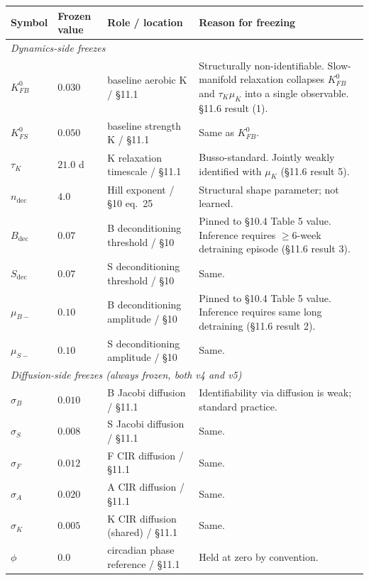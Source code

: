 \begin{center}\small
\begin{tabular}{lllp{6cm}}
\toprule
Symbol & Frozen value & Role / location & Reason for freezing \\
\midrule
\multicolumn{4}{l}{\textit{Dynamics-side freezes}} \\
\midrule
$K_{FB}^0$  & $0.030$ & baseline aerobic K / §11.1   & Structurally non-identifiable. Slow-manifold relaxation collapses $K_{FB}^0$ and $\tau_K \mu_K$ into a single observable. §11.6 result (1). \\
$K_{FS}^0$  & $0.050$ & baseline strength K / §11.1  & Same as $K_{FB}^0$. \\
$\tau_K$    & $21.0$ d & K relaxation timescale / §11.1 & Busso-standard. Jointly weakly identified with $\mu_K$ (§11.6 result 5). \\
$n_\text{dec}$ & $4.0$ & Hill exponent / §10 eq.\ 25 & Structural shape parameter; not learned. \\
$B_\text{dec}$ & $0.07$ & B deconditioning threshold / §10 & Pinned to §10.4 Table 5 value. Inference requires $\ge 6$-week detraining episode (§11.6 result 3). \\
$S_\text{dec}$ & $0.07$ & S deconditioning threshold / §10 & Same. \\
$\mu_{B-}$ & $0.10$ & B deconditioning amplitude / §10 & Pinned to §10.4 Table 5 value. Inference requires same long detraining (§11.6 result 2). \\
$\mu_{S-}$ & $0.10$ & S deconditioning amplitude / §10 & Same. \\
\midrule
\multicolumn{4}{l}{\textit{Diffusion-side freezes (always frozen, both v4 and v5)}} \\
\midrule
$\sigma_B$ & $0.010$ & B Jacobi diffusion / §11.1 & Identifiability via diffusion is weak; standard practice. \\
$\sigma_S$ & $0.008$ & S Jacobi diffusion / §11.1 & Same. \\
$\sigma_F$ & $0.012$ & F CIR diffusion / §11.1 & Same. \\
$\sigma_A$ & $0.020$ & A CIR diffusion / §11.1 & Same. \\
$\sigma_K$ & $0.005$ & K CIR diffusion (shared) / §11.1 & Same. \\
$\phi$    & $0.0$    & circadian phase reference / §11.1 & Held at zero by convention. \\
\bottomrule
\end{tabular}
\end{center}

